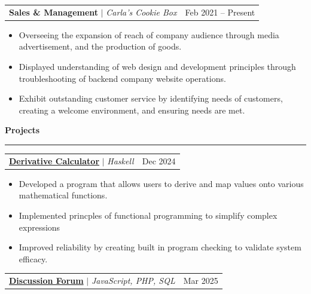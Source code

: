 \documentclass[letterpaper]{article}
\newcommand{\ressection}[1]{
    \vspace{1.0em}
    \noindent\textbf{\large #1}
    \par\vspace{0.3em}
    \hrule
    \vspace{0.6em}
}
\begin{document}
\begin{tabularx}{\textwidth}{X r}
    \textbf{Sales \& Management} $|$ \textit{Carla's Cookie Box} & Feb 2021 -- Present
\end{tabularx}

\vspace{-0.5em}

\begin{itemize}[leftmargin=2.5em, itemsep=-0.2em]
    \item \parbox[t]{\dimexpr\linewidth-2.5em}{Overseeing the expansion of reach of company audience through media advertisement, and the production of goods.}
    \item \parbox[t]{\dimexpr\linewidth-2.5em}{Displayed understanding of web design and development principles through troubleshooting of backend company website operations.}
    \item \parbox[t]{\dimexpr\linewidth-2.5em}{Exhibit outstanding customer service by identifying needs of customers, creating a welcome environment, and ensuring needs are met.}
\end{itemize}

\ressection{Projects}

\begin{tabularx}{\textwidth}{X r}
    \textbf{\href{https://github.com/LucaMawyin/CS1JC3/blob/master/Assignments/1JC3-Assign4/src/Assign_4.hs}{Derivative Calculator}} $|$ \textit{Haskell} & Dec 2024 \\
\end{tabularx}

\vspace{-0.5em}

\begin{itemize}[leftmargin=2.5em, itemsep=-0.2em]
    \item Developed a program that allows users to derive and map values onto various mathematical functions.
    \item Implemented princples of functional programming to simplify complex expressions
    \item Improved reliability by creating built in program checking to validate system efficacy.
\end{itemize}

\begin{tabularx}{\textwidth}{X r}
    \textbf{\href{https://github.com/LucaMawyin/discussionForum}{Discussion Forum}} $|$ \textit{JavaScript, PHP, SQL} & Mar 2025 \\
\end{tabularx}
\end{document}
